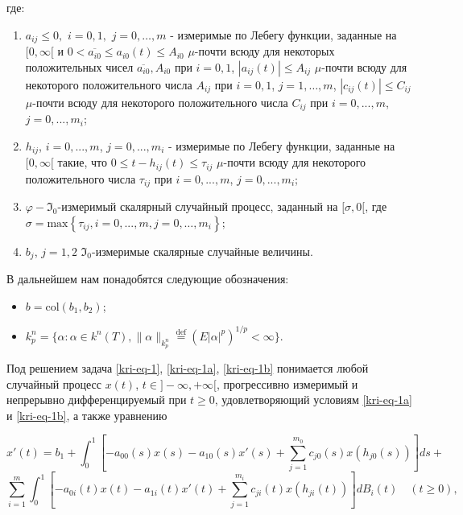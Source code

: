где:

\begin{enumerate}
	\item[1.]
	$a_{ij}\le 0,$ $i=0,1,$ $j=0,\dots,m$ - измеримые по Лебегу	функции, заданные на $[0,\infty [$ и  $0<\overline{a_{\mathit{i0}}}\le a_{\mathit{i0}}(t)\le A_{\mathit{i0}}$ $\mu$-почти всюду для некоторых положительных чисел $\overline{a_{\mathit{i0}}},A_{\mathit{i0}}$ при $i=0,1$, $|a_{ij}(t)|\le A_{ij}$ $\mu$-почти всюду для некоторого положительного числа  $A_{ij}$ при $i=0,1$, $j=1,\dots,m$, $|c_{ij}(t)|\le C_{ij}$ $\mu$-почти всюду для некоторого положительного числа  $C_{ij}$ при $i=0,...,m$, $j=0,...,m_i$;
	
	\item[2.]
	$h_{ij}$, $i=0,...,m$, $j=0,...,m_i$ - измеримые по Лебегу функции, заданные на $[0,\infty [$ такие, что $0 \le t-h_{ij}(t)\le \tau_{ij}$ $\mu$-почти всюду для некоторого положительного числа  $\tau_{ij}$ при $i=0,...,m$, $j=0,...,m_i$;
	
	\item[3.]
	$\varphi - \Im_0$-измеримый скалярный случайный процесс, заданный на $[\sigma ,0[$, где \linebreak $\sigma =\text{max}\left\{\tau_{ij}, i=0,...,m, j=0,\dots,m_i\right\}$;
	
	\item[4.]
	$b_j$, $j=1,2$ $\Im_0$-измеримые скалярные случайные величины.
\end{enumerate}

В дальнейшем нам понадобятся следующие обозначения:

\begin{itemize}
	\item[-]
	$b=\text{col}(b_1,b_2)$;
	
	\item[-]
	$k_p^n=\{\alpha :\alpha \in k^n(T),\|\alpha \|_{k_p^n}\overset{\text{def}}{=}\left(E|\alpha
	|^p\right)^{1/p}<\infty \}$.
\end{itemize}

Под решением задача \eqref{kri-eq-1}, \eqref{kri-eq-1a}, \eqref{kri-eq-1b} понимается любой случайный процесс $x(t)$, $t\in ]-\infty ,+\infty[$, прогрессивно измеримый и непрерывно дифференцируемый при  $t\ge 0$, удовлетворяющий условиям \eqref{kri-eq-1a} и \eqref{kri-eq-1b}, а также уравнению

\begin{equation}\label{kri-eq-1-1}
	x'(t) = b_1+ \int_{0}^{1} \left[-a_{00}(s)x(s) - a_{10}(s)x'(s) + \sum_{j=1}^{m_0}c_{j0}(s)x(h_{j0}(s))\right]ds +
\end{equation}
\begin{equation*}
	\sum_{i=1}^{m} \int_{0}^{1} \left[-a_{0i}(t)x(t)-a_{1i}(t)x'(t)+\sum_{j=1}^{m_i}c_{ji}(t)x(h_{ji}(t))\right]dB_i(t) \quad (t \ge 0),
\end{equation*}

